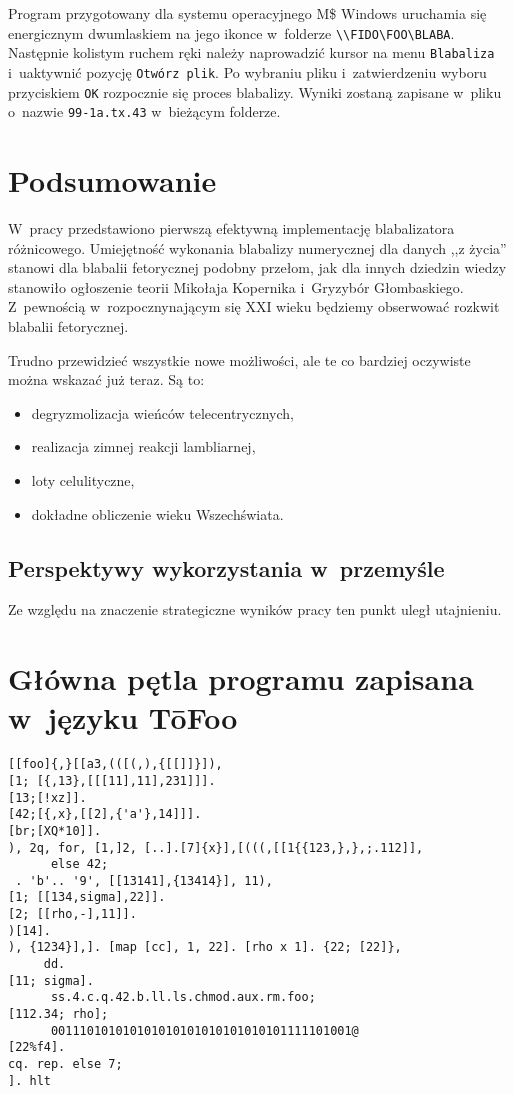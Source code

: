 Program przygotowany dla systemu operacyjnego M\$ Windows uruchamia
się energicznym dwumlaskiem na jego ikonce w~folderze
\verb+\\FIDO\FOO\BLABA+.  Następnie kolistym ruchem ręki należy
naprowadzić kursor na menu \texttt{Blabaliza} i~uaktywnić pozycję
\texttt{Otwórz plik}.  Po wybraniu pliku i~zatwierdzeniu wyboru
przyciskiem \texttt{OK} rozpocznie się proces blabalizy.  Wyniki
zostaną zapisane w~pliku o~nazwie \texttt{99-1a.tx.43} w~bieżącym
folderze.

\chapter{Podsumowanie}

W~pracy przedstawiono pierwszą efektywną implementację blabalizatora
różnicowego.  Umiejętność wykonania blabalizy numerycznej dla danych
,,z życia'' stanowi dla blabalii fetorycznej podobny przełom, jak dla
innych dziedzin wiedzy stanowiło ogłoszenie teorii Mikołaja Kopernika
i~Gryzybór Głombaskiego.  Z~pewnością w~rozpocznynającym się XXI wieku
będziemy obserwować rozkwit blabalii fetorycznej.

Trudno przewidzieć wszystkie nowe możliwości, ale te co bardziej
oczywiste można wskazać już teraz.  Są to:
\begin{itemize}
    \item degryzmolizacja wieńców telecentrycznych,
    \item realizacja zimnej reakcji lambliarnej,
    \item loty celulityczne,
    \item dokładne obliczenie wieku Wszechświata.
\end{itemize}

\section{Perspektywy wykorzystania w~przemyśle}

Ze względu na znaczenie strategiczne wyników pracy ten punkt uległ
utajnieniu.

\appendix

\chapter{Główna pętla programu zapisana w~języku T\=oFoo}

\begin{verbatim}
[[foo]{,}[[a3,(([(,),{[[]]}]),
[1; [{,13},[[[11],11],231]]].
[13;[!xz]].
[42;[{,x},[[2],{'a'},14]]].
[br;[XQ*10]].
), 2q, for, [1,]2, [..].[7]{x}],[(((,[[1{{123,},},;.112]],
      else 42;
 . 'b'.. '9', [[13141],{13414}], 11),
[1; [[134,sigma],22]].
[2; [[rho,-],11]].
)[14].
), {1234}],]. [map [cc], 1, 22]. [rho x 1]. {22; [22]},
     dd.
[11; sigma].
      ss.4.c.q.42.b.ll.ls.chmod.aux.rm.foo;
[112.34; rho];
      001110101010101010101010101010101111101001@
[22%f4].
cq. rep. else 7;
]. hlt
\end{verbatim}

